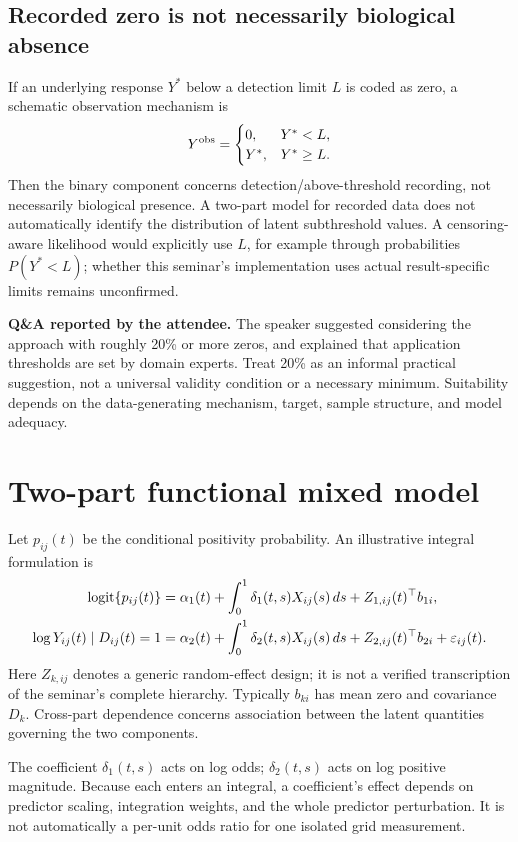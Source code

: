 \documentclass[11pt]{article}
\begin{document}
\subsection{Recorded zero is not necessarily biological absence}
If an underlying response $Y^*$ below a detection limit $L$ is coded as zero, a schematic observation mechanism is
\[
Y^{\rm obs}=\begin{cases}0,&Y^*<L,\\Y^*,&Y^*\geq L.\end{cases}
\]
Then the binary component concerns detection/above-threshold recording, not necessarily biological presence. A two-part model for recorded data does not automatically identify the distribution of latent subthreshold values. A censoring-aware likelihood would explicitly use $L$, for example through probabilities $P(Y^*<L)$; whether this seminar's implementation uses actual result-specific limits remains unconfirmed.

\textbf{Q\&A reported by the attendee.} The speaker suggested considering the approach with roughly 20\% or more zeros, and explained that application thresholds are set by domain experts. Treat 20\% as an informal practical suggestion, not a universal validity condition or a necessary minimum. Suitability depends on the data-generating mechanism, target, sample structure, and model adequacy.
\section{Two-part functional mixed model}
Let $p_{ij}(t)$ be the conditional positivity probability. An illustrative integral formulation is
\begin{align}
\operatorname{logit}\{p_{ij}(t)\}&=\alpha_1(t)+\int_0^1\delta_1(t,s)X_{ij}(s)\,ds+Z_{1,ij}(t)^\top b_{1i},\\
\log Y_{ij}(t)\mid D_{ij}(t)=1&=\alpha_2(t)+\int_0^1\delta_2(t,s)X_{ij}(s)\,ds+Z_{2,ij}(t)^\top b_{2i}+\varepsilon_{ij}(t).
\end{align}
Here $Z_{k,ij}$ denotes a generic random-effect design; it is not a verified transcription of the seminar's complete hierarchy. Typically $b_{ki}$ has mean zero and covariance $D_k$. Cross-part dependence concerns association between the latent quantities governing the two components.

The coefficient $\delta_1(t,s)$ acts on log odds; $\delta_2(t,s)$ acts on log positive magnitude. Because each enters an integral, a coefficient's effect depends on predictor scaling, integration weights, and the whole predictor perturbation. It is not automatically a per-unit odds ratio for one isolated grid measurement.
\end{document}
